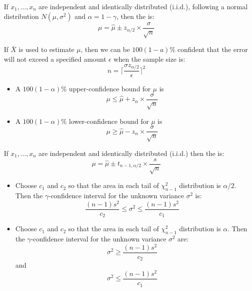 \begin{multicols}{3}

    \par If $x_1, \ldots, x_n$ are independent and identically distributed (i.i.d.), following a normal distribution $N(\mu, \sigma^2)$ and $\alpha = 1 - \gamma$, then the  is:
    \[
      \mu = \hat{\mu} \pm z_{\alpha / 2} \times \frac{\sigma}{\sqrt{n}}
    \]

      \par If $\bar{X}$ is used to estimate $\mu$, then we can be $100(1 - a)\%$ confident that the error will not exceed a specified amount $\epsilon$ when the sample size is:
      \[
        n = \bigg\lceil \frac{\sigma z_{\alpha/2}}{\epsilon} \bigg\rceil^2
      \]

      \begin{itemize}
        \item A $100(1 - \alpha)\%$ upper-confidence bound for $\mu$ is
        \[
          \mu \leq \hat{\mu} + z_{\alpha} \times \frac{\sigma}{\sqrt{n}}
        \]
        \item A $100(1 - \alpha)\%$ lower-confidence bound for $\mu$ is
        \[
          \mu \geq \hat{\mu} - z_{\alpha} \times \frac{\sigma}{\sqrt{n}}
        \]
      \end{itemize}

     \par If $x_1, \ldots, x_n$ are independent and identically distributed (i.i.d.) then the  is:
     \[
      \mu = \hat{\mu} \pm t_{n - 1, \alpha / 2} \times \frac{s}{\sqrt{n}}
     \]
      \begin{itemize}
        \item {}
        \par Choose $c_1$ and $c_2$ so that the area in each tail of $\chi_{n - 1}^2$ distribution is $\alpha / 2$. Then the $\gamma$-confidence interval
        for the unknown variance $\sigma^2$ is:
        \[
          \frac{(n - 1)s^2}{c_2} \leq \sigma^2 \leq \frac{(n - 1)s^2}{c_1}
        \]
        \item {}
        \par Choose $c_1$ and $c_2$ so that the area in each tail of $\chi_{n - 1}^2$ distribution is $\alpha$. Then the $\gamma$-confidence interval
        for the unknown variance $\sigma^2$ are:
        \[
          \sigma^2 \geq \frac{(n - 1)s^2}{c_2}
        \]
        and
        \[
          \sigma^2 \leq \frac{(n - 1)s^2}{c_1}
        \]
      \end{itemize}


\end{multicols}
